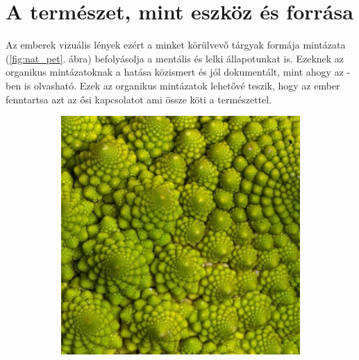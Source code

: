 \chapter{A természet, mint eszköz és forrása}

Az emberek vizuális lények ezért a minket körülvevő tárgyak formája mintázata (\ref{fig:nat_pet}. ábra) befolyásolja a mentális és lelki állapotunkat is. Ezeknek az organikus mintázatoknak a hatása közismert és jól dokumentált, mint ahogy az \cite{jo2019physiological} -ben is olvasható. Ezek az organikus mintázatok lehetővé teszik, hogy az ember fenntartsa azt az ősi kapcsolatot ami össze köti a természettel. 

\begin{figure}[ht!]
	\centering
	\begin{subfigure}[b]{0.225\textwidth}
		\centering
		\includegraphics[width=\textwidth]{img/nat_pat_01.jpg}
		\caption{}    
	\end{subfigure}
	\hspace{10 mm}
	\begin{subfigure}[b]{0.225\textwidth}  
		\centering 

\end{subfigure}
\end{figure}
